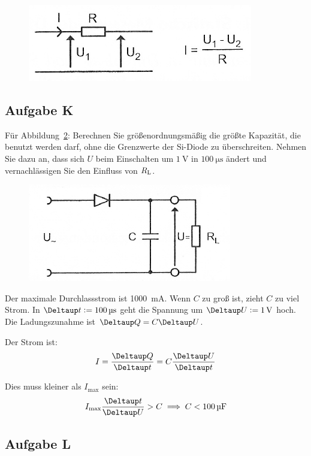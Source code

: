 \begin{figure}[htbp]
	\centering
	\includegraphics[width=.6\linewidth]{Bilder_aus_Anleitung/2-7.png}
	\caption{%
		\cite[Abbildung~2.7]{physik313-Anleitung}
	}
	\label{fig:2-7}
\end{figure}

\FloatBarrier
\subsection{Aufgabe K}

\begin{problem}
	Für Abbildung~\ref{fig:2-8}: Berechnen Sie größenordnungsmäßig die größte
	Kapazität, die benutzt werden darf, ohne die Grenzwerte der Si-Diode zu
	überschreiten. Nehmen Sie dazu an, dass sich $U$ beim Einschalten um
	$\SI{1}\volt$ in $\SI{100}{\micro\second}$ ändert und vernachlässigen Sie
	den Einfluss von $R_\text L$.
\end{problem}

\begin{figure}[htbp]
	\centering
	\includegraphics[width=.45\linewidth]{Bilder_aus_Anleitung/2-8.png}
	\caption{%
		\cite[Abbildung~2.8]{physik313-Anleitung}
	}
	\label{fig:2-8}
\end{figure}

Der maximale Durchlassstrom ist \SI{1000}{\milli\ampere}. Wenn $C$ zu groß ist,
zieht $C$ zu viel Strom. In $\Deltaup t := \SI{100}{\micro\second}$ geht die
Spannung um $\Deltaup U := \SI1\volt$ hoch. Die Ladungszunahme ist $\Deltaup Q
= C \Deltaup U$.

Der Strom ist:
\[
	I = \frac{\Deltaup Q}{\Deltaup t}
	= C \frac{\Deltaup U}{\Deltaup t}
\]

Dies muss kleiner als $I_\text{max}$ sein:
\[
	I_\text{max} \frac{\Deltaup t}{\Deltaup U} > C
	\implies
	C < \SI{100}{\micro\farad}
\]

\FloatBarrier
\subsection{Aufgabe L}


